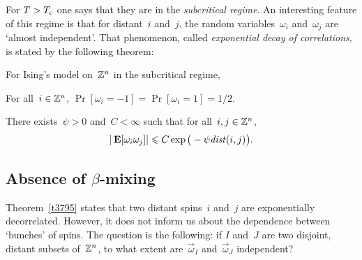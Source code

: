 For $T>T_{\mathrm{c}}$ one says that they are in the \emph{subcritical regime}.
An interesting feature of this regime is that for distant~$i$ and~$j$,
the random variables~$\omega_i$ and~$\omega_j$ are `almost independent'.
That phenomenon, called \emph{exponential decay of correlations},
is stated by the following theorem:
%
\begin{Thm}\label{t3795}
For Ising's model on~$\mathbb{Z}^n$ in the subcritical regime,
\begin{ienumerate}
\item\label{i6505} For all~$i\in\mathbb{Z}^n$, $\Pr[\omega_i=-1] = \Pr[\omega_i=1] = 1/2$.
\item\label{i1366} There exists~$\psi>0$ and~$C<\infty$
such that for all~$i,j\in\mathbb{Z}^n$,
\[ | \EE[\omega_i\omega_j] | \leq C \exp\big(-\psi\dist(i,j)\big) .\]
\end{ienumerate}
\end{Thm}

\subsection{Absence of \texorpdfstring{$\beta$}{beta}-mixing}

Theorem~\ref{t3795} states that two distant spins~$i$ and~$j$ are exponentially decorrelated.
However, it does not inform us about the dependence between `bunches' of spins.
The question is the following: if $I$ and~$J$ are two disjoint, distant subsets of~$\mathbb{Z}^n$,
to what extent are~$\vec\omega_I$ and~$\vec\omega_J$ independent?

